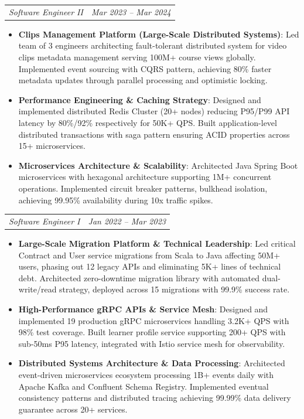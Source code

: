 \documentclass[letterpaper,10.5pt]{article}
\makeatletter
\newcommand{\resumeItem}[2]{
  \item\small{
    \textbf{#1}{: #2 \vspace{-2pt}}
  }
}
\newcommand{\resumeSubSubheading}[2]{
    \begin{tabular*}{0.97\textwidth}{l@{\extracolsep{\fill}}r}
      \textit{\small#1} & \textit{\small #2} \\
    \end{tabular*}\vspace{-4pt}
}
\newcommand{\resumeItemListStart}{\begin{itemize}[itemsep=2pt, parsep=0pt]}
\newcommand{\resumeItemListEnd}{\end{itemize}\vspace{-4pt}}
\makeatother
\begin{document}
  \resumeSubSubheading
    {Software Engineer II}{Mar 2023 -- Mar 2024}
    \resumeItemListStart
      \resumeItem{Clips Management Platform (Large-Scale Distributed Systems)}
        {Led team of 3 engineers architecting fault-tolerant distributed system for video clips metadata management serving 100M+ course views globally. Implemented event sourcing with CQRS pattern, achieving 80\% faster metadata updates through parallel processing and optimistic locking.}
      \resumeItem{Performance Engineering \& Caching Strategy}
        {Designed and implemented distributed Redis Cluster (20+ nodes) reducing P95/P99 API latency by 80\%/92\% respectively for 50K+ QPS. Built application-level distributed transactions with saga pattern ensuring ACID properties across 15+ microservices.}
      \resumeItem{Microservices Architecture \& Scalability}
        {Architected Java Spring Boot microservices with hexagonal architecture supporting 1M+ concurrent operations. Implemented circuit breaker patterns, bulkhead isolation, achieving 99.95\% availability during 10x traffic spikes.}
    \resumeItemListEnd

  \resumeSubSubheading
    {Software Engineer I}{Jan 2022 -- Mar 2023}
    \resumeItemListStart
      \resumeItem{Large-Scale Migration Platform \& Technical Leadership}
        {Led critical Contract and User service migrations from Scala to Java affecting 50M+ users, phasing out 12 legacy APIs and eliminating 5K+ lines of technical debt. Architected zero-downtime migration library with automated dual-write/read strategy, deployed across 15 migrations with 99.9\% success rate.}
      \resumeItem{High-Performance gRPC APIs \& Service Mesh}
        {Designed and implemented 19 production gRPC microservices handling 3.2K+ QPS with 98\% test coverage. Built learner profile service supporting 200+ QPS with sub-50ms P95 latency, integrated with Istio service mesh for observability.}
      \resumeItem{Distributed Systems Architecture \& Data Processing}
        {Architected event-driven microservices ecosystem processing 1B+ events daily with Apache Kafka and Confluent Schema Registry. Implemented eventual consistency patterns and distributed tracing achieving 99.99\% data delivery guarantee across 20+ services.}
    \resumeItemListEnd



\end{document}
